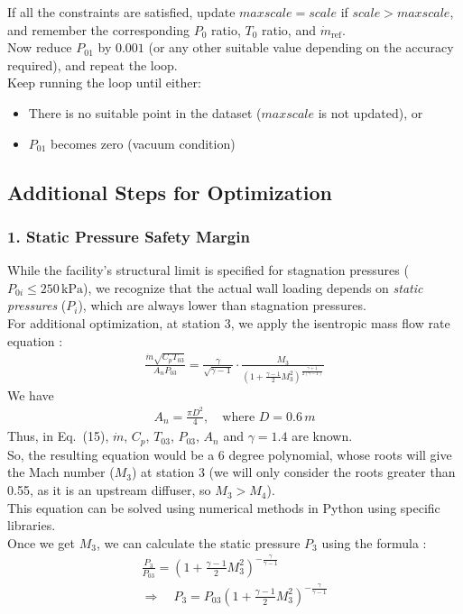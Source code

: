 \documentclass[12pt,a4paper]{article}
\begin{document}
If all the constraints are satisfied, update $\mathit{maxscale} = \mathit{scale}$ if $\mathit{scale} > \mathit{maxscale}$, and remember the corresponding $P_0$ ratio, $T_0$ ratio, and $\dot{m}_{\mathrm{ref}}$.\\

Now reduce $P_{01}$ by $0.001$ (or any other suitable value depending on the accuracy required), and repeat the loop.\\
Keep running the loop until either:
\begin{itemize}
    \item There is no suitable point in the dataset ($\mathit{maxscale}$ is not updated), or
    \item $P_{01}$ becomes zero (vacuum condition)
\end{itemize}

\subsection*{Additional Steps for Optimization}

\subsubsection*{1. Static Pressure Safety Margin}
While the facility's structural limit is specified for stagnation pressures ($P_{0i} \leq 250\,\mathrm{kPa}$), we recognize that the actual wall loading depends on \textit{static pressures} ($P_i$), which are always lower than stagnation pressures.\\
For additional optimization, at station 3, we apply the isentropic mass flow rate equation :
\begin{align}
\frac{\dot{m} \sqrt{C_p T_{03}}}{A_n P_{03}} 
= \frac{\gamma}{\sqrt{\gamma - 1}} \cdot 
\frac{M_3}{\left(1 + \frac{\gamma - 1}{2} M_3^2 \right)^{\frac{\gamma + 1}{2(\gamma - 1)}}}
\end{align}
We have
\begin{align}
A_n = \frac{\pi D^2}{4}, \quad \text{where } D = 0.6\,m
\end{align}
Thus, in Eq.~(15), $\dot{m}$, $C_p$, $T_{03}$, $P_{03}$, $A_n$ and $\gamma=1.4$ are known.\\
So, the resulting equation would be a 6 degree polynomial, whose roots will give the Mach number ($M_3$) at station 3 (we will only consider the roots greater than 0.55, as it is an upstream diffuser, so $M_3 > M_4$).\\
This equation can be solved using numerical methods in Python using specific libraries.\\
Once we get $M_3$, we can calculate the static pressure $P_3$ using the formula :
\begin{align}
\frac{P_3}{P_{03}} = \left( 1 + \frac{\gamma - 1}{2} M_3^2 \right)^{-\frac{\gamma}{\gamma - 1}} \nonumber \\
\Rightarrow \quad P_3 = P_{03} \left( 1 + \frac{\gamma - 1}{2} M_3^2 \right)^{-\frac{\gamma}{\gamma - 1}}
\end{align}
\end{document}
